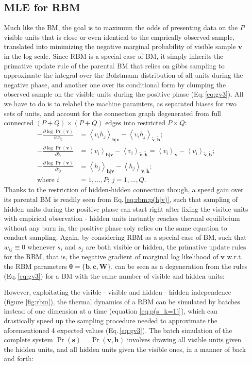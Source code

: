 \documentclass[11pt]{article}
\newcommand{\mean}[2]{\left\langle{#1}\right\rangle_{#2}}
\newcommand{\vb}{\boldsymbol{b}}
\newcommand{\vc}{\boldsymbol{c}}
\newcommand{\vh}{\boldsymbol{h}}
\newcommand{\vv}{\boldsymbol{v}}
\newcommand{\vs}{\boldsymbol{s}}
\newcommand{\mw}{\boldsymbol{W}}
\newcommand{\vht}{\tilde{\vh}}
\newcommand{\vvt}{\tilde{\vv}}
\newcommand{\pEC}{\boldsymbol{\theta}}
\newcommand{\PDV}[2]{\frac{\partial #1}{\partial #2}}
\begin{document}
{\subsection{MLE for RBM}
Much like the BM, the goal is to maximum the odds of presenting data on the $P$ visible units that is close or even identical to the emprically observed sample, translated into minimizing the negative marginal probability of visible sample $\vv$ in the log scale. Since RBM is a special case of BM, it simply inherits the primative update rule of the parental BM that relies on gibbs sampling to approximate the integral over the Bolztmann distribution of all units during the negative phase, and another one over its conditional form by clumping the observed sample on the visible units during the positive phase (Eq.\,\ref{eq:gv3}). All we have to do is to relabel the machine paramters, as separated biases for two sets of units, and account for the connection graph degenerated from full connected $(P+Q) \times (P+Q)$ edges into restricted $P \times Q$:
\begin{align*}
  -\PDV{\log{\Pr(\vv)}}{w_{ij}} & = \mean{v_i h_j}{\vh|\vv} - \mean{v_i h_j}{\vvt, \vht}; \\
  -\PDV{\log{\Pr(\vv)}}{b_i} & = \mean{v_i}{\vh|\vv} - \mean{v_i}{\vvt, \vht} = \mean{v_i}{\vv} - \mean{v_i}{\vvt, \vht}; \\
  -\PDV{\log{\Pr(\vv)}}{c_j} & = \mean{h_j}{\vh|\vv} - \mean{h_j}{\vvt, \vht}; \\
  \textrm{where } i & = 1, \dots, P;\, j = 1, \dots, Q.
\end{align*}
Thanks to the restriction of hidden-hidden connection though, a speed gain over its parental BM is readily seen from Eq.\,\eqref{eq:rbm:p(h|v)}, such that sampling of hidden units during the positive phase can start right after fixing the visible units with empirical observation - hidden units instantly reaches thermal equilibrium without any burn in, the positive phase soly relies on the same equation to conduct sampling.
Again, by considering RBM as a special case of BM, such that $w_{ij} \equiv 0$ whenever $s_i$ and $s_j$ are both visible or hidden, the primative update rules for the RBM, that is, the negative gradient of marginal log likelihood of $\vv$ w.r.t. the RBM parameters $\pEC=\{\vb, \vc, \mw\}$, can be seen as a degeneration from the rules (Eq.\,\ref{eq:gv3}) for a BM with the same number of visible and hidden units:

However, exploitating the visible - visible and hidden - hidden independence (figure \ref{fig:rbm}), the thermal dynamics of a RBM can be simulated by batches instead of one dimension at a time (equation \ref{eq:p(s_k=1)}), which can drastically speed up the sampling procedure needed to approximate the aforementioned 4 expected values (Eq.\,\ref{eq:gv3}). The batch simulation of the complete system $\Pr(\vs)=\Pr(\vv, \vh)$ involves drawing all visible units given the hidden units, and all hidden units given the visible ones, in a manner of back and forth:

}
\end{document}
